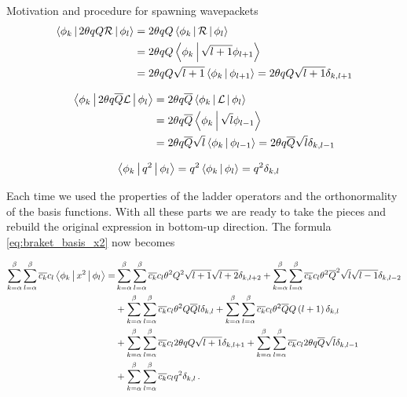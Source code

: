 \begin{chapter}{Motivation and procedure for spawning wavepackets}
\begin{equation*}
\begin{split}
  \Braket{\phi_k | 2\theta qQ \mathcal{R} | \phi_l} & = 2\theta qQ \Braket{\phi_k | \mathcal{R} | \phi_l} \\
  & = 2\theta qQ \Braket{\phi_k | \sqrt{l+1} \phi_{l+1}} \\
  & = 2\theta qQ \sqrt{l+1} \Braket{\phi_k | \phi_{l+1}}
    = 2\theta qQ \sqrt{l+1} \delta_{k,l+1}
\end{split}
\end{equation*}

\begin{equation*}
\begin{split}
  \Braket{\phi_k | 2\theta q\overline{Q} \mathcal{L} | \phi_l} & = 2\theta q\overline{Q} \Braket{\phi_k | \mathcal{L} | \phi_l} \\
  & = 2\theta q\overline{Q} \Braket{\phi_k | \sqrt{l} \phi_{l-1}} \\
  & = 2\theta q\overline{Q} \sqrt{l} \Braket{\phi_k | \phi_{l-1}}
    = 2\theta q\overline{Q} \sqrt{l} \delta_{k,l-1}
\end{split}
\end{equation*}

\begin{equation*}
\begin{split}
  \Braket{\phi_k | q^2 | \phi_l} & = q^2 \Braket{\phi_k | \phi_l} = q^2 \delta_{k,l}
\end{split}
\end{equation*}

Each time we used the properties of the ladder operators and the orthonormality
of the basis functions. With all these parts we are ready to take the pieces and
rebuild the original expression in bottom-up direction. The formula \eqref{eq:braket_basis_x2}
now becomes

\begin{equation} \label{eq:seven_double_sums}
\begin{split}
  \sum_{k=\alpha}^\beta \sum_{l=\alpha}^\beta \overline{c_k} c_l \Braket{\phi_k | x^2 | \phi_l} =
  & \sum_{k=\alpha}^\beta \sum_{l=\alpha}^\beta \overline{c_k} c_l \theta^2 Q^2 \sqrt{l+1} \sqrt{l+2} \delta_{k,l+2}
    + \sum_{k=\alpha}^\beta \sum_{l=\alpha}^\beta \overline{c_k} c_l \theta^2 \overline{Q}^2 \sqrt{l} \sqrt{l-1} \delta_{k,l-2} \\
  & + \sum_{k=\alpha}^\beta \sum_{l=\alpha}^\beta \overline{c_k} c_l \theta^2 Q\overline{Q} l \delta_{k,l}
    + \sum_{k=\alpha}^\beta \sum_{l=\alpha}^\beta \overline{c_k} c_l \theta^2 \overline{Q}Q \left(l+1\right) \delta_{k,l} \\
  & + \sum_{k=\alpha}^\beta \sum_{l=\alpha}^\beta \overline{c_k} c_l 2\theta qQ \sqrt{l+1} \delta_{k,l+1}
    + \sum_{k=\alpha}^\beta \sum_{l=\alpha}^\beta \overline{c_k} c_l 2\theta q\overline{Q} \sqrt{l} \delta_{k,l-1} \\
  & + \sum_{k=\alpha}^\beta \sum_{l=\alpha}^\beta \overline{c_k} c_l q^2 \delta_{k,l} \,.
\end{split}
\end{equation}


\end{chapter}
